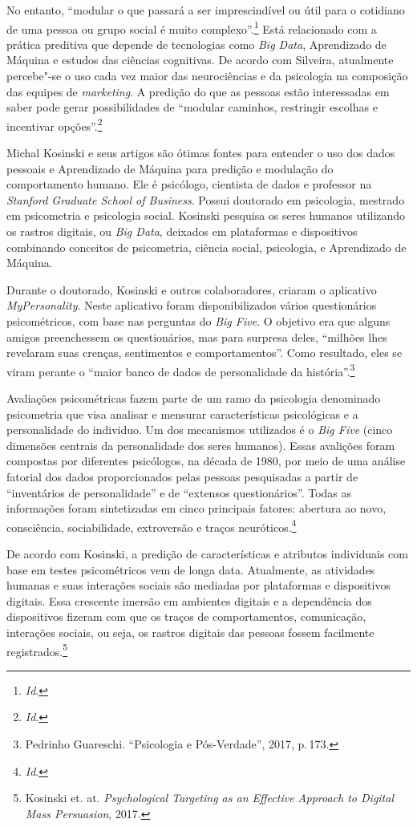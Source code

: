No entanto, ``modular o que passará a ser imprescindível ou útil para o
cotidiano de uma pessoa ou grupo social é muito complexo''.\footnote{\textit{Id}.} Está relacionado com a prática preditiva que depende
de tecnologias como \emph{Big Data}, Aprendizado de Máquina e estudos
das ciências cognitivas. De acordo com Silveira, atualmente percebe"-se
o uso cada vez maior das neurociências e da psicologia na composição das
equipes de \emph{marketing}. A predição do que as pessoas estão interessadas em
saber pode gerar possibilidades de ``modular caminhos, restringir
escolhas e incentivar opções''.\footnote{\textit{Id}.}

Michal Kosinski e seus artigos são ótimas fontes para entender o uso dos
dados pessoais e Aprendizado de Máquina para predição e modulação do
comportamento humano. Ele é psicólogo, cientista de dados e professor na
\emph{Stanford Graduate School of Business}. Possui doutorado em
psicologia, mestrado em psicometria e psicologia social. Kosinski
pesquisa os seres humanos utilizando os rastros digitais, ou \emph{Big
Data}, deixados em plataformas e dispositivos combinando conceitos de
psicometria, ciência social, psicologia, e Aprendizado de Máquina.

Durante o doutorado, Kosinski e outros colaboradores, criaram o
aplicativo \emph{MyPersonality}. Neste aplicativo foram disponibilizados
vários questionários psicométricos, com base nas perguntas do \emph{Big
Five}. O objetivo era que alguns amigos preenchessem os questionários,
mas para surpresa deles, ``milhões lhes revelaram suas crenças,
sentimentos e comportamentos''. Como resultado, eles se viram perante o
``maior banco de dados de personalidade da história''.\footnote{Pedrinho Guareschi. ``Psicologia e Pós-Verdade'', 2017, p.\,173.}

Avaliações psicométricas fazem parte de um ramo da psicologia denominado
psicometria que visa analisar e mensurar características psicológicas e a personalidade do individuo. Um dos
mecanismos utilizados é o \emph{Big Five} (cinco dimensões centrais da
personalidade dos seres humanos). Essas avalições foram compostas por
diferentes psicólogos, na década de 1980, por meio de uma análise
fatorial dos dados proporcionados pelas pessoas pesquisadas a partir de
``inventários de personalidade'' e de ``extensos questionários''. Todas
as informações foram sintetizadas em cinco principais fatores: abertura
ao novo, consciência, sociabilidade, extroversão e traços neuróticos.\footnote{\textit{Id}.}

De acordo com Kosinski, a predição de características e
atributos individuais com base em testes psicométricos vem de longa
data. Atualmente, as atividades humanas e suas interações sociais são
mediadas por plataformas e dispositivos digitais. Essa crescente imersão
em ambientes digitais e a dependência dos dispositivos fizeram com que
os traços de comportamentos, comunicação, interações sociais, ou seja,
os rastros digitais das pessoas fossem facilmente registrados.\footnote{Kosinski et. at. \emph{Psychological Targeting as an Effective Approach to Digital Mass
Persuasion}, 2017.}


